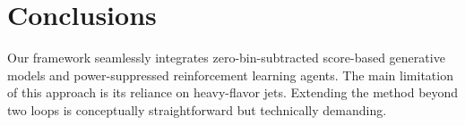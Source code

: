 \section{Conclusions}\label{sec:conclusions}

Our framework seamlessly integrates zero-bin-subtracted score-based
generative models and power-suppressed reinforcement learning agents.
The main limitation of this approach is its reliance on heavy-flavor
jets. Extending the method beyond two loops is conceptually
straightforward but technically demanding.

